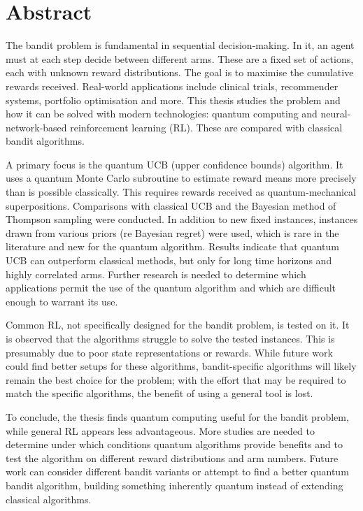 
\chapter{Abstract}
The bandit problem is fundamental in sequential decision-making.
In it, an agent must at each step decide between different arms.
These are a fixed set of actions, each with unknown reward distributions.
The goal is to maximise the cumulative rewards received.
Real-world applications include clinical trials, recommender systems, portfolio optimisation and more.
This thesis studies the problem and how it can be solved with modern technologies: quantum computing and neural-network-based reinforcement learning (RL).
These are compared with classical bandit algorithms.

A primary focus is the quantum UCB (upper confidence bounds) algorithm.
It uses a quantum Monte Carlo subroutine to estimate reward means more precisely than is possible classically.
This requires rewards received as quantum-mechanical superpositions.
Comparisons with classical UCB and the Bayesian method of Thompson sampling were conducted.
In addition to new fixed instances, instances drawn from various priors (re Bayesian regret) were used, which is rare in the literature and new for the quantum algorithm.
Results indicate that quantum UCB can outperform classical methods, but only for long time horizons and highly correlated arms.
Further research is needed to determine which applications permit the use of the quantum algorithm and which are difficult enough to warrant its use.

Common RL, not specifically designed for the bandit problem, is tested on it.
It is observed that the algorithms struggle to solve the tested instances.
This is presumably due to poor state representations or rewards.
While future work could find better setups for these algorithms, bandit-specific algorithms will likely remain the best choice for the problem; with the effort that may be required to match the specific algorithms, the benefit of using a general tool is lost.

To conclude, the thesis finds quantum computing useful for the bandit problem, while general RL appears less advantageous.
More studies are needed to determine under which conditions quantum algorithms provide benefits and to test the algorithm on different reward distributions and arm numbers.
Future work can consider different bandit variants or attempt to find a better quantum bandit algorithm, building something inherently quantum instead of extending classical algorithms.



\cleardoublepage